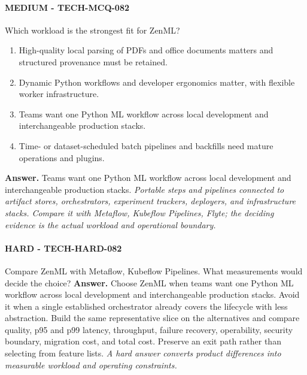 \paragraph{MEDIUM - TECH-MCQ-082} Which workload is the strongest fit for ZenML?
\begin{enumerate}[label=\Alph*.]
\item High-quality local parsing of PDFs and office documents matters and structured provenance must be retained.
\item Dynamic Python workflows and developer ergonomics matter, with flexible worker infrastructure.
\item Teams want one Python ML workflow across local development and interchangeable production stacks.
\item Time- or dataset-scheduled batch pipelines and backfills need mature operations and plugins.
\end{enumerate}
\textbf{Answer.} Teams want one Python ML workflow across local development and interchangeable production stacks.
\textit{Portable steps and pipelines connected to artifact stores, orchestrators, experiment trackers, deployers, and infrastructure stacks. Compare it with Metaflow, Kubeflow Pipelines, Flyte; the deciding evidence is the actual workload and operational boundary.}
\paragraph{HARD - TECH-HARD-082} Compare ZenML with Metaflow, Kubeflow Pipelines. What measurements would decide the choice?
\textbf{Answer.} Choose ZenML when teams want one Python ML workflow across local development and interchangeable production stacks. Avoid it when a single established orchestrator already covers the lifecycle with less abstraction. Build the same representative slice on the alternatives and compare quality, p95 and p99 latency, throughput, failure recovery, operability, security boundary, migration cost, and total cost. Preserve an exit path rather than selecting from feature lists.
\textit{A hard answer converts product differences into measurable workload and operating constraints.}
